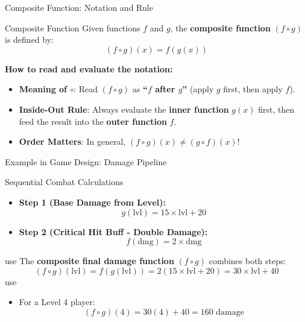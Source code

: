 \begin{frame}{Composite Function: Notation and Rule}
\begin{defn}{Composite Function}{}
Given functions $f$ and $g$, the \textbf{composite function} $(f \circ g)$ is defined by:
\[ (f \circ g)(x) = f(g(x)) \]
\end{defn}

\textbf{How to read and evaluate the notation:}
\begin{itemize}
\item \textbf{Meaning of $\circ$}: Read $(f \circ g)$ as \textbf{``$f$ after $g$''} (apply $g$ first, then apply $f$). 
\item \textbf{Inside-Out Rule}: Always evaluate the \textbf{inner function} $g(x)$ first, then feed the result into the \textbf{outer function} $f$. 
\item \textbf{Order Matters}: In general, $(f \circ g)(x) \neq (g \circ f)(x)$!
\end{itemize}
\end{frame}

\begin{frame}{Example in Game Design: Damage Pipeline}
\begin{block}{Sequential Combat Calculations}
\begin{itemize}
\item \textbf{Step 1 (Base Damage from Level):}
\[ g(\text{lvl}) = 15 \times \text{lvl} + 20 \]
\item \textbf{Step 2 (Critical Hit Buff - Double Damage):}
\[ f(\text{dmg}) = 2 \times \text{dmg} \]
\end{itemize}
\end{block}
use
\medskip
The \textbf{composite final damage function} $(f \circ g)$ combines both steps:
\[ (f \circ g)(\text{lvl}) = f(g(\text{lvl})) = 2(15 \times \text{lvl} + 20) = 30 \times \text{lvl} + 40 \]
use
\begin{itemize}
\item For a Level 4 player:
\[ (f \circ g)(4) = 30(4) + 40 = 160\text{ damage} \]
\end{itemize}
\end{frame}

